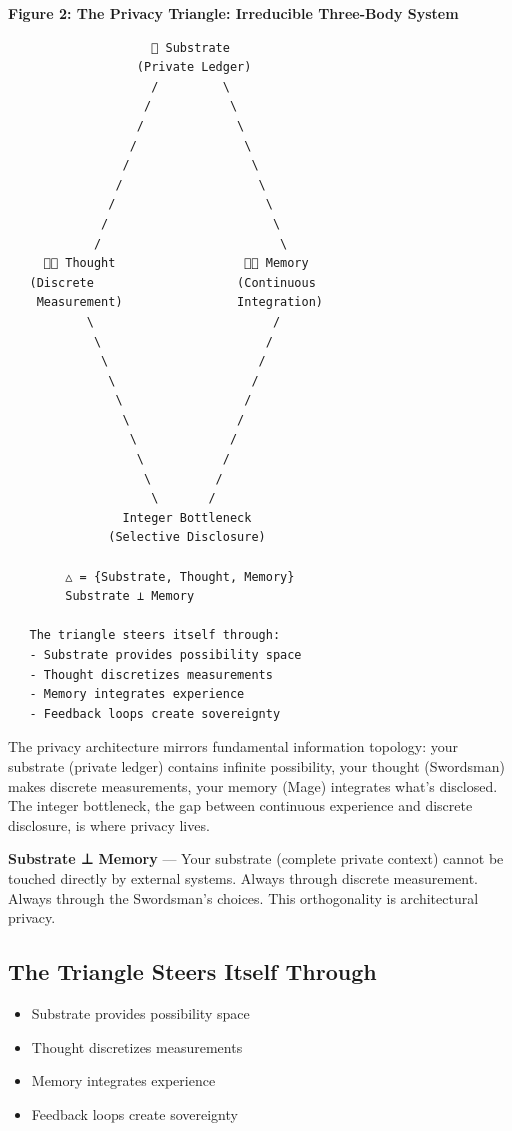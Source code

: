 \documentclass[
]{article}
\begin{document}
\textbf{Figure 2: The Privacy Triangle: Irreducible Three-Body System}

\begin{verbatim}
                    🌳 Substrate
                  (Private Ledger)
                    /         \
                   /           \
                  /             \
                 /               \
                /                 \
               /                   \
              /                     \
             /                       \
            /                         \
     🦅💭 Thought                  🦅🧠 Memory
   (Discrete                    (Continuous
    Measurement)                Integration)
           \                         /
            \                       /
             \                     /
              \                   /
               \                 /
                \               /
                 \             /
                  \           /
                   \         /
                    \       /
                Integer Bottleneck
              (Selective Disclosure)

        △ = {Substrate, Thought, Memory}
        Substrate ⊥ Memory

   The triangle steers itself through:
   - Substrate provides possibility space
   - Thought discretizes measurements
   - Memory integrates experience
   - Feedback loops create sovereignty
\end{verbatim}

The privacy architecture mirrors fundamental information topology: your
substrate (private ledger) contains infinite possibility, your thought
(Swordsman) makes discrete measurements, your memory (Mage) integrates
what's disclosed. The integer bottleneck, the gap between continuous
experience and discrete disclosure, is where privacy lives.

\textbf{Substrate ⊥ Memory} --- Your substrate (complete private
context) cannot be touched directly by external systems. Always through
discrete measurement. Always through the Swordsman's choices. This
orthogonality is architectural privacy.

\subsection{The Triangle Steers Itself
Through}\label{the-triangle-steers-itself-through}

\begin{itemize}
\item
  Substrate provides possibility space
\item
  Thought discretizes measurements
\item
  Memory integrates experience
\item
  Feedback loops create sovereignty
\end{itemize}
\end{document}

